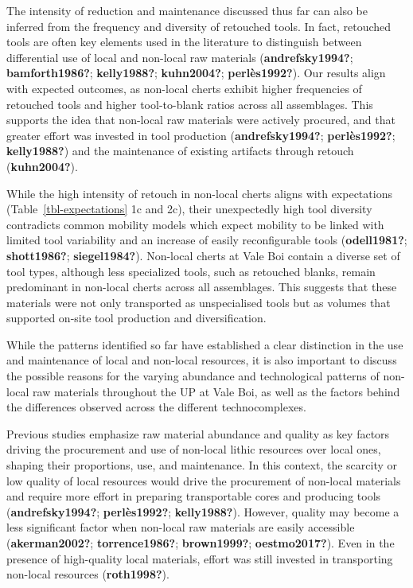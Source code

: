 \documentclass[
  a4paper,
  DIV=11,
  numbers=noendperiod]{scrreprt}
\begin{document}
The intensity of reduction and maintenance discussed thus far can also
be inferred from the frequency and diversity of retouched tools. In
fact, retouched tools are often key elements used in the literature to
distinguish between differential use of local and non-local raw
materials (\textbf{andrefsky1994?}; \textbf{bamforth1986?};
\textbf{kelly1988?}; \textbf{kuhn2004?}; \textbf{perlès1992?}). Our
results align with expected outcomes, as non-local cherts exhibit higher
frequencies of retouched tools and higher tool-to-blank ratios across
all assemblages. This supports the idea that non-local raw materials
were actively procured, and that greater effort was invested in tool
production (\textbf{andrefsky1994?}; \textbf{perlès1992?};
\textbf{kelly1988?}) and the maintenance of existing artifacts through
retouch (\textbf{kuhn2004?}).

While the high intensity of retouch in non-local cherts aligns with
expectations (Table~\ref{tbl-expectations} 1c and 2c), their
unexpectedly high tool diversity contradicts common mobility models
which expect mobility to be linked with limited tool variability and an
increase of easily reconfigurable tools (\textbf{odell1981?};
\textbf{shott1986?}; \textbf{siegel1984?}). Non-local cherts at Vale Boi
contain a diverse set of tool types, although less specialized tools,
such as retouched blanks, remain predominant in non-local cherts across
all assemblages. This suggests that these materials were not only
transported as unspecialised tools but as volumes that supported on-site
tool production and diversification.

While the patterns identified so far have established a clear
distinction in the use and maintenance of local and non-local resources,
it is also important to discuss the possible reasons for the varying
abundance and technological patterns of non-local raw materials
throughout the UP at Vale Boi, as well as the factors behind the
differences observed across the different technocomplexes.

Previous studies emphasize raw material abundance and quality as key
factors driving the procurement and use of non-local lithic resources
over local ones, shaping their proportions, use, and maintenance. In
this context, the scarcity or low quality of local resources would drive
the procurement of non-local materials and require more effort in
preparing transportable cores and producing tools
(\textbf{andrefsky1994?}; \textbf{perlès1992?}; \textbf{kelly1988?}).
However, quality may become a less significant factor when non-local raw
materials are easily accessible (\textbf{akerman2002?};
\textbf{torrence1986?}; \textbf{brown1999?}; \textbf{oestmo2017?}). Even
in the presence of high-quality local materials, effort was still
invested in transporting non-local resources (\textbf{roth1998?}).
\end{document}
